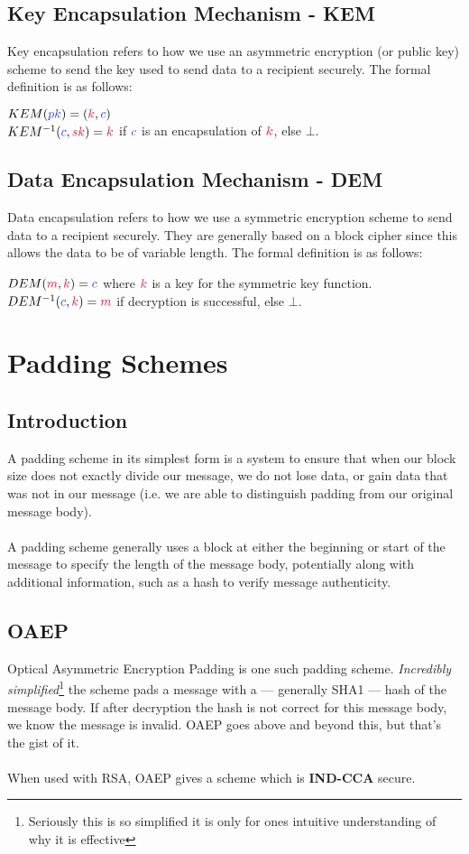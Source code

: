 	\subsection{Key Encapsulation Mechanism - KEM}
		Key encapsulation refers to how we use an asymmetric encryption (or public key) scheme to send the key used to send data to a recipient securely. The formal definition is as follows:
		\begin{center}
			$KEM(\cpk) = (\cK,\cc)$\\
			$KEM^{-1}(\cc, \csk) = \cK$ \quad if $\cc$ is an encapsulation of $\cK$, else $\bot$.
		\end{center}

	\subsection{Data Encapsulation Mechanism - DEM}
		Data encapsulation refers to how we use a symmetric encryption scheme to send data to a recipient securely. They are generally based on a block cipher since this allows the data to be of variable length. The formal definition is as follows:
		\begin{center}
			$DEM(\cm,\cK) = \cc$ \quad where $\cK$ is a key for the symmetric key function.\\
			$DEM^{-1}(\cc,\ck) = \cm $ \quad if decryption is successful, else $\bot$.
		\end{center}


\section{Padding Schemes}

	\subsection{Introduction}
		A padding scheme in its simplest form is a system to ensure that when our block size does not exactly divide our message, we do not lose data, or gain data that was not in our message (i.e. we are able to distinguish padding from our original message body).\\
		\\
		A padding scheme generally uses a block at either the beginning or start of the message to specify the length of the message body, potentially along with additional information, such as a hash to verify message authenticity.

	\subsection{OAEP}
		Optical Asymmetric Encryption Padding is one such padding scheme. \textit{Incredibly simplified}\footnote{Seriously this is so simplified it is only for ones intuitive understanding of why it is effective} the scheme pads a message with a --- generally SHA1 --- hash of the message body. If after decryption the hash is not correct for this message body, we know the message is invalid. OAEP goes above and beyond this, but that's the gist of it.\\
		\\
		When used with RSA, OAEP gives a scheme which is \textbf{IND-CCA} secure.


